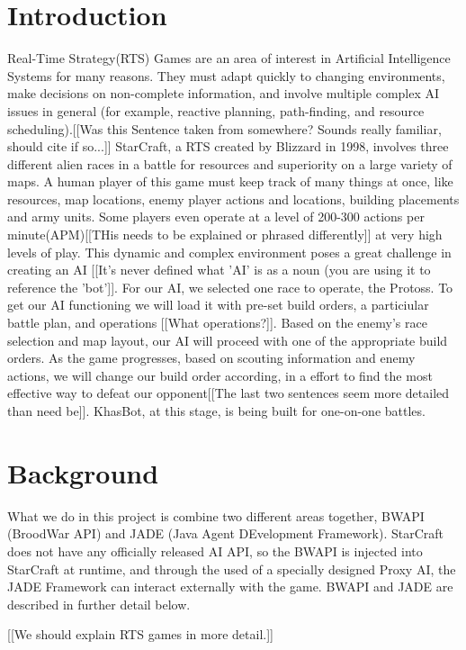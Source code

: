 \documentclass[letterpaper]{article}
\begin{document}
\section{Introduction}
Real-Time Strategy(RTS) Games are an area of interest in Artificial Intelligence Systems for many reasons.  They must adapt quickly to changing environments, make decisions on non-complete information, and involve multiple complex AI issues in general (for example, reactive planning, path-finding, and resource scheduling).[[Was this Sentence taken from somewhere? Sounds really familiar, should cite if so...]]  StarCraft, a RTS created by Blizzard in 1998, involves three different alien races in a battle for resources and superiority on a large variety of maps.  A human player of this game must keep track of many things at once, like resources, map locations, enemy player actions and locations, building placements and army units.  Some players even operate at a level of 200-300 actions per minute(APM)[[THis needs to be explained or phrased differently]] at very high levels of play.  This dynamic and complex environment poses a great challenge in creating an AI [[It's never defined what 'AI' is as a noun (you are using it to reference the 'bot']].  For our AI, we selected one race to operate, the Protoss.  To get our AI functioning we will load it with pre-set build orders, a particiular battle plan, and operations [[What operations?]].  Based on the enemy's race selection and map layout, our AI will proceed with one of the appropriate build orders.  As the game progresses, based on scouting information and enemy actions, we will change our build order according, in a effort to find the most effective way to defeat our opponent[[The last two sentences seem more detailed than need be]].  KhasBot, at this stage, is being built for one-on-one battles.

\section{Background}
What we do in this project is combine two different areas together, BWAPI (BroodWar API) and JADE (Java Agent DEvelopment Framework).  StarCraft does not have any officially released AI API, so the BWAPI is injected into StarCraft at runtime, and through the used of a specially designed Proxy AI, the JADE Framework can interact externally with the game.  BWAPI and JADE are described in further detail below.

[[We should explain RTS games in more detail.]]
\end{document}
